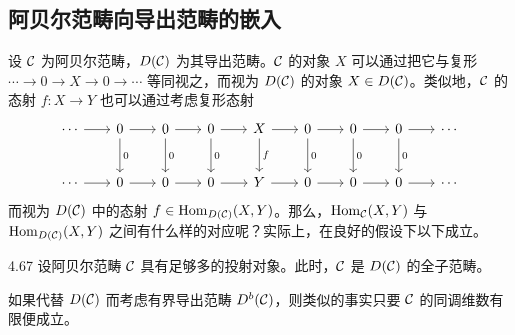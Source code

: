 \subsection{阿贝尔范畴向导出范畴的嵌入}

设 $\mathcal{C}$ 为阿贝尔范畴，$D(\mathcal{C})$ 为其导出范畴。$\mathcal{C}$ 的对象 $X$ 可以通过把它与复形 $\cdots\to 0\to X\to 0\to\cdots$ 等同视之，而视为 $D(\mathcal{C})$ 的对象 $X\in D(\mathcal{C})$。类似地，$\mathcal{C}$ 的态射 $f\colon X\to Y$ 也可以通过考虑复形态射
\[\begin{tikzcd}[row sep=2.4em, column sep=1.9em]
  \cdots \arrow[r] & 0 \arrow[r] \arrow[d,"0"] & 0 \arrow[r] \arrow[d,"0"] & 0 \arrow[r] \arrow[d,"0"] & X \arrow[r] \arrow[d,"f"] & 0 \arrow[r] \arrow[d,"0"] & 0 \arrow[r] \arrow[d,"0"] & 0 \arrow[r] \arrow[d,"0"] & \cdots \\
  \cdots \arrow[r] & 0 \arrow[r] & 0 \arrow[r] & 0 \arrow[r] & Y \arrow[r] & 0 \arrow[r] & 0 \arrow[r] & 0 \arrow[r] & \cdots
\end{tikzcd}\]
而视为 $D(\mathcal{C})$ 中的态射 $f\in\operatorname{Hom}_{D(\mathcal{C})}(X,Y)$。那么，$\operatorname{Hom}_{\mathcal{C}}(X,Y)$ 与 $\operatorname{Hom}_{D(\mathcal{C})}(X,Y)$ 之间有什么样的对应呢？实际上，在良好的假设下以下成立。

\begin{proposition}{4.67}
设阿贝尔范畴 $\mathcal{C}$ 具有足够多的投射对象。此时，$\mathcal{C}$ 是 $D(\mathcal{C})$ 的全子范畴。
\end{proposition}

如果代替 $D(\mathcal{C})$ 而考虑有界导出范畴 $D^b(\mathcal{C})$，则类似的事实只要 $\mathcal{C}$ 的同调维数有限便成立。

